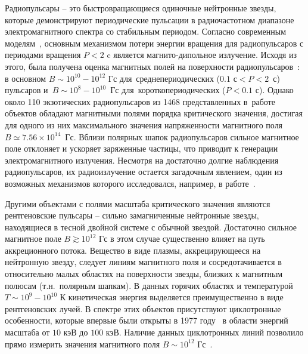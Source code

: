 Радиопульсары -- это быстровращающиеся одиночные нейтронные 
звезды, которые демонстрируют периодические пульсации в радиочастотном 
диапазоне электромагнитного спектра со стабильным периодом. Согласно 
современным моделям~\cite{Gunn:1969,Pacini:1970}, основным механизмом потери 
энергии вращения для радиопульсаров с периодами вращения $P<2$ c является 
магнито-дипольное излучение. Исходя из этого, была получена оценка магнитных 
полей на поверхности радиопульсаров~\cite{Kim:2023}: в основном $B\sim 10^{10}-10^{12}$ Гс для~среднепериодических ($0.1\text{ с}<P<2$~с) пульсаров и~$B\sim10^8-10^{10}$~Гс для~короткопериодических ($P<0.1$ с). Однако около 110 экзотических радиопульсаров из 1468 представленных в~работе~\cite{Kim:2023} объектов обладают магнитными полями 
порядка критического значения, достигая для одного из них максимального 
значения напряженности магнитного поля $B\simeq7.56 \times 10^{14}$~Гс. Вблизи 
полярных шапок радиопульсаров сильное магнитное поле отклоняет и ускоряет 
заряженные частицы, что приводит к генерации электромагнитного излучения.    
Несмотря на достаточно долгие наблюдения радиопульсаров, их радиоизлучение 
остается загадочным явлением, один из возможных механизмов которого 
исследовался, например, в работе~\cite{Philippov_2020}.
	
Другими объектами с полями масштаба критического значения 
являются рентгеновские пульсары -- сильно замагниченные нейтронные звезды, 
находящиеся в тесной двойной системе с обычной звездой. Достаточно сильное 
магнитное поле $B\gtrsim10^{12}$ Гс в этом случае существенно влияет на путь 
аккреционного потока. Вещество в виде плазмы, аккрецирующееся на нейтронную 
звезду, следует линиям магнитного поля и сосредотачивается в относительно малых 
областях на поверхности звезды, близких к магнитным полюсам (т.н.~полярным 
шапкам). В данных горячих областях и температурой $T\sim10^9-10^{10}$ К кинетическая энергия 
выделяется преимущественно в виде рентгеновских лучей. В спектре этих объектов 
присутствуют циклотронные особенности, которые впервые были открыты в 1977 
году~\cite{Trumper:1977} в области энергий масштаба от $10$ кэВ до $100$ кэВ. Наличие данных циклотронных линий позволило прямо измерить 
значения магнитного поля $B\sim10^{12}$ Гс~\cite{Staubert:2019}.
 


